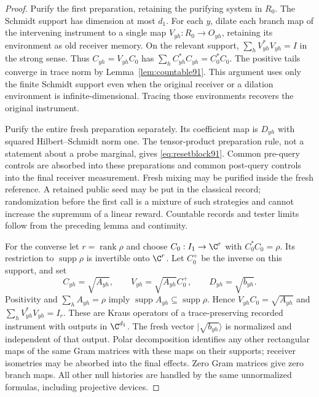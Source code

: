\begin{proof}
Purify the first preparation, retaining the purifying system in $R_0$.
The Schmidt support has dimension at most $d_1$.  For each $y$, dilate
each branch map of the intervening instrument to a single map
$V_{yh}:R_0\to O_{yh}$, retaining its environment as old receiver
memory.  On the relevant support,
$\sum_hV_{yh}^*V_{yh}=I$ in the strong sense.  Thus
$C_{yh}=V_{yh}C_0$ has
$\sum_h C_{yh}^*C_{yh}=C_0^*C_0$.
The positive tails converge in trace norm by Lemma~\ref{lem:countable91}.
This argument uses only the finite Schmidt support even when the
original receiver or a dilation environment is infinite-dimensional.
Tracing those environments recovers the original instrument.

Purify the entire fresh preparation separately.  Its coefficient map
is $D_{yh}$ with squared Hilbert--Schmidt norm one.  The tensor-product
preparation rule, not a statement about a probe marginal, gives
\eqref{eq:resetblock91}.  Common pre-query controls are absorbed into
these preparations and common post-query controls into the final
receiver measurement.  Fresh mixing may be purified inside the fresh
reference.  A retained public seed may be put in the classical record;
randomization before the first call is a mixture of such strategies and
cannot increase the supremum of a linear reward.  Countable records
and tester limits follow from the preceding lemma and continuity.

For the converse let $r=\operatorname{rank}\rho$ and choose
$C_0:I_1\to\C^r$ with $C_0^*C_0=\rho$.  Its restriction to
$\operatorname{supp}\rho$ is invertible onto $\C^r$.  Let $C_0^+$
be the inverse on this support, and set
\[
 C_{yh}=\sqrt{A_{yh}},\qquad
 V_{yh}=\sqrt{A_{yh}}C_0^+,\qquad D_{yh}=\sqrt{b_{yh}}.
\]
Positivity and $\sum_hA_{yh}=\rho$ imply
$\operatorname{supp}A_{yh}\subseteq\operatorname{supp}\rho$.
Hence $V_{yh}C_0=\sqrt{A_{yh}}$ and
$\sum_hV_{yh}^*V_{yh}=I_r$.  These are Kraus operators of a
trace-preserving recorded instrument with outputs in $\C^{d_1}$.
The fresh vector $|\sqrt{b_{yh}}\rangle$ is normalized and independent
of that output.  Polar decomposition identifies any other rectangular
maps of the same Gram matrices with these maps on their supports;
receiver isometries may be absorbed into the final effects.
Zero Gram matrices give zero branch maps.  All other null histories are
handled by the same unnormalized formulas, including projective devices.
\end{proof}

